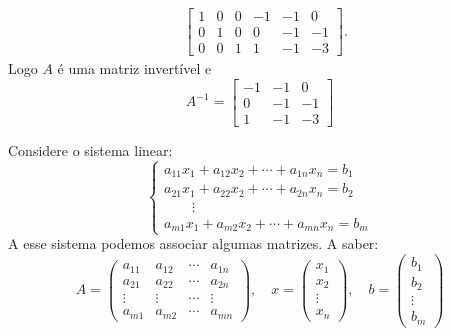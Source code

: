 \begin{exemplo}
\begin{solucao}
\begin{align*}
            &\left[
                \begin{array}{ccc|ccc}
                    1 & 0 & 0 & -1 & -1 & 0\\
                    0 & 1 & 0 & 0 & -1 & -1\\
                    0 & 0 & 1 & 1 & -1 & -3
                \end{array}
            \right].
        \end{align*}
        Logo $A$ é uma matriz invertível e
        \[
            A^{-1} = \begin{bmatrix}
                    -1 & -1 & 0\\
                    0 & -1 & -1\\
                    1 & -1 & -3
                \end{bmatrix}
        \]
    \end{solucao}
\end{exemplo}
Considere o sistema linear: 
\begin{equation}
\begin{cases}
        a_{11}x_1 + a_{12}x_2 + \cdots + a_{1n}x_n = b_1\\
        a_{21}x_1 + a_{22}x_2 + \cdots + a_{2n}x_n = b_2\\
        \qquad \vdots\\
        a_{m1}x_1 + a_{m2}x_2 + \cdots + a_{mn}x_n = b_m
    \end{cases}
\end{equation}
A esse sistema podemos associar algumas matrizes. A saber:
\[
    A = \begin{pmatrix}
        a_{11} & a_{12} & \cdots & a_{1n}\\
        a_{21} & a_{22} & \cdots & a_{2n}\\
        \vdots & \vdots & \cdots & \vdots\\
        a_{m1} & a_{m2} & \cdots & a_{mn}
    \end{pmatrix}, \quad
    x = \begin{pmatrix}
        x_1\\
        x_2\\
        \vdots\\
        x_n
    \end{pmatrix},\quad 
    b = \begin{pmatrix}
        b_1\\
        b_2\\
        \vdots\\
        b_m
    \end{pmatrix}
\]

